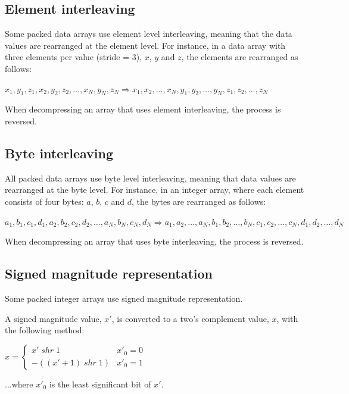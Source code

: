 \subsection{Element interleaving}
Some packed data arrays use element level interleaving, meaning that the
data values are rearranged at the element level. For instance, in a data array
with three elements per value (stride = 3), $x$, $y$ and $z$, the elements are
rearranged as follows:

\begin{center}
$x_1,y_1,z_1,x_2,y_2,z_2,\ldots,x_N,y_N,z_N \Rightarrow 
x_1,x_2,\ldots,x_N,y_1,y_2,\ldots,y_N,z_1,z_2,\ldots,z_N$
\end{center}

When decompressing an array that uses element interleaving, the process is
reversed.

\subsection{Byte interleaving}
All packed data arrays use byte level interleaving, meaning that data values
are rearranged at the byte level. For instance, in an integer array, where each
element consists of four bytes: $a$, $b$, $c$ and $d$, the bytes are rearranged
as follows:

\begin{center}
$a_1,b_1,c_1,d_1,a_2,b_2,c_2,d_2,\ldots,a_N,b_N,c_N,d_N \Rightarrow 
a_1,a_2,\ldots,a_N,b_1,b_2,\ldots,b_N,c_1,c_2,\ldots,c_N,d_1,d_2,\ldots,d_N$
\end{center}

When decompressing an array that uses byte interleaving, the process is
reversed.

\subsection{Signed magnitude representation}
Some packed integer arrays use signed magnitude representation.

A signed magnitude value, $x'$, is converted to a two's complement value,
$x$, with the following method:

$x = \begin{cases}
x'\; shr\; 1 & x'_0 = 0 \\
-((x'+1)\; shr\; 1) & x'_0 = 1
\end{cases}$

...where $x'_0$ is the least significant bit of $x'$.




